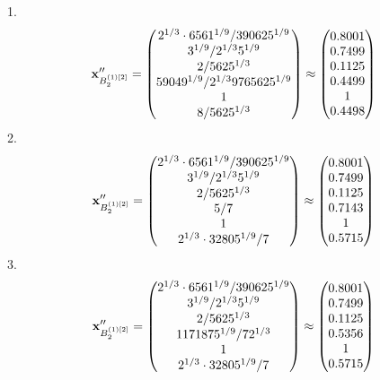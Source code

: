 \documentclass[10pt,a4paper]{article}
\begin{document}
	1.
	\[
		\bold{x}''_{B_2^{(1)[2]}} = 
		\begin{pmatrix}
			{{2^ {1 / 3}} \cdot {6561^ {1 / 9}}} / {{390625^ {1 / 9}}} \\
			{{3^ {1 / 9}}} / {{2^ {1 / 3}}{5^ {1 / 9}}} \\
			{{2}} / {{5625^ {1 / 3}}} \\
			{{59049^ {1 / 9}}} / {{2^ {1 / 3}}{9765625^ {1 / 9}}} \\
			{1}{} \\
			{{8}} / {{5625^ {1 / 3}}} \\
		\end{pmatrix}
		\approx
		\begin{pmatrix}
			0.8001   \\
			0.7499   \\
			0.1125   \\
			0.4499   \\
			1        \\
			0.4498   \\
		\end{pmatrix}
	\]
	2.
	\[
		\bold{x}''_{B_2^{(1)[2]}} = 
		\begin{pmatrix}
			{{2^ {1 / 3}} \cdot {6561^ {1 / 9}}} / {{390625^ {1 / 9}}} \\
			{{3^ {1 / 9}}} / {{2^ {1 / 3}}{5^ {1 / 9}}} \\
			{{2}} / {{5625^ {1 / 3}}} \\
			{{5}} / {{7}} \\
			{1}{} \\
			{{2^ {1 / 3}} \cdot {32805^ {1 / 9}}} / {{7}} \\
		\end{pmatrix}
		\approx
		\begin{pmatrix}
			0.8001   \\
			0.7499   \\
			0.1125   \\
			0.7143   \\
			1        \\
			0.5715   \\
		\end{pmatrix}
	\]
	3.
	\[
		\bold{x}''_{B_2^{(1)[2]}} = 
		\begin{pmatrix}
			{{2^ {1 / 3}} \cdot {6561^ {1 / 9}}} / {{390625^ {1 / 9}}} \\
			{{3^ {1 / 9}}} / {{2^ {1 / 3}}{5^ {1 / 9}}} \\
			{{2}} / {{5625^ {1 / 3}}} \\
			{{1171875^ {1 / 9}}} / {{7}{2^ {1 / 3}}} \\
			{1}{} \\
			{{2^ {1 / 3}} \cdot {32805^ {1 / 9}}} / {{7}} \\
		\end{pmatrix}
		\approx
		\begin{pmatrix}
			0.8001   \\
			0.7499   \\
			0.1125   \\
			0.5356   \\
			1        \\
			0.5715   \\
		\end{pmatrix}
	\]
\end{document}
